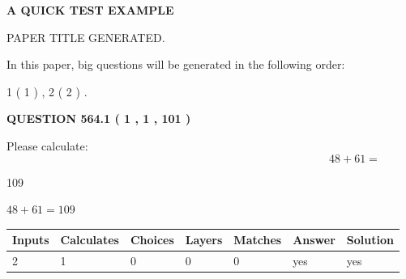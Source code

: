\documentclass[12pt]{article}
\begin{document}
   
   
   
   
   
 \vspace{0.2in}
{\LARGE {\textbf{ A QUICK TEST EXAMPLE}}}
   
   
 PAPER TITLE GENERATED.
   
   
   
\vspace{0.2in}
   
In this paper, big questions will be generated in the following order: 
   
   
   1 ( 1 )
 ,
   2 ( 2 )
 .
  
\vspace{0.2in}
  
{\textbf{\Large{QUESTION
564.1 
 ( 1 , 1 , 101 )
}}}
  
  
 
Please calculate:
\begin{equation}
48 +  %
61 = \nonumber
\end{equation}
 
 
 
\noindent{}
 
 

109
 
 
\noindent{}
 
 

 
 
 
\noindent{}
 
 

$ %
48 +  %
61=   %
109$
 
 
\noindent{}
 
 

 
   
   
   
   
\noindent\begin{tabular}{|l|l|l|l|l|l|l|}
 \hline
Inputs & Calculates & Choices & Layers & Matches & Answer & Solution \\ \hline
 2  & 
 1  & 
 0
  & 
 0  & 
 0  & 
  yes & 
  yes 
  \\ \hline
 \end{tabular}
   
   
   
\end{document}
